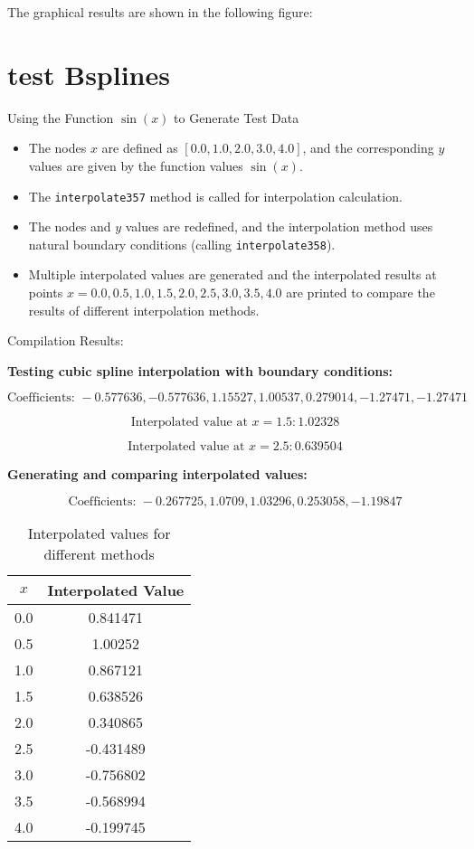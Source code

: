 \documentclass[a4paper]{article}
\begin{document}
The graphical results are shown in the following figure:

\section*{test Bsplines}
Using the Function \(\sin(x)\) to Generate Test Data

\begin{itemize}
    \item The nodes \(x\) are defined as \([0.0, 1.0, 2.0, 3.0, 4.0]\), and the corresponding \(y\) values are given by the function values \(\sin(x)\).
    \item The \texttt{interpolate357} method is called for interpolation calculation.
    \item The nodes and \(y\) values are redefined, and the interpolation method uses natural boundary conditions (calling \texttt{interpolate358}).
    \item Multiple interpolated values are generated and the interpolated results at points \(x = 0.0, 0.5, 1.0, 1.5, 2.0, 2.5, 3.0, 3.5, 4.0\) are printed to compare the results of different interpolation methods.
\end{itemize}

Compilation Results:

\textbf{Testing cubic spline interpolation with boundary conditions:}

\[
\text{Coefficients: } -0.577636, -0.577636, 1.15527, 1.00537, 0.279014, -1.27471, -1.27471
\]

\[
\text{Interpolated value at } x = 1.5: 1.02328
\]

\[
\text{Interpolated value at } x = 2.5: 0.639504
\]

\textbf{Generating and comparing interpolated values:}

\[
\text{Coefficients: } -0.267725, 1.0709, 1.03296, 0.253058, -1.19847
\]

\begin{table}[h!]
\centering
\begin{tabular}{|c|c|}
\hline
$x$ & Interpolated Value \\
\hline
0.0 & 0.841471 \\
0.5 & 1.00252 \\
1.0 & 0.867121 \\
1.5 & 0.638526 \\
2.0 & 0.340865 \\
2.5 & -0.431489 \\
3.0 & -0.756802 \\
3.5 & -0.568994 \\
4.0 & -0.199745 \\
\hline
\end{tabular}
\caption{Interpolated values for different methods}
\end{table}
\end{document}
